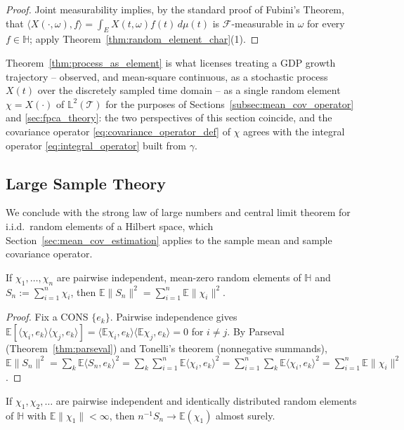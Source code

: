 \begin{proof}
Joint measurability implies, by the standard proof of Fubini's Theorem,
that $\langle X(\cdot,\omega),f\rangle=\int_EX(t,\omega)f(t)\,d\mu(t)$ is
$\mathcal{F}$-measurable in $\omega$ for every $f\in\mathbb{H}$; apply
Theorem~\ref{thm:random_element_char}(1).
\end{proof}

Theorem~\ref{thm:process_as_element} is what licenses treating a GDP
growth trajectory -- observed, and mean-square continuous, as a
stochastic process $X(t)$ over the discretely sampled time domain -- as a
single random element $\chi=X(\cdot)$ of $\mathbb{L}^2(\mathcal{T})$ for
the purposes of Sections~\ref{subsec:mean_cov_operator} and
\ref{sec:fpca_theory}: the two perspectives of this section coincide, and
the covariance operator \eqref{eq:covariance_operator_def} of $\chi$
agrees with the integral operator \eqref{eq:integral_operator} built from
$\gamma$.

\subsection{Large Sample Theory}
\label{subsec:large_sample}

We conclude with the strong law of large numbers and central limit
theorem for i.i.d.\ random elements of a Hilbert space, which
Section~\ref{sec:mean_cov_estimation} applies to the sample mean and
sample covariance operator.

\begin{theorem}
\label{thm:pairwise_variance}
If $\chi_1,\dots,\chi_n$ are pairwise independent, mean-zero random
elements of $\mathbb{H}$ and $S_n:=\sum_{i=1}^n\chi_i$, then $\mathbb{E}
\|S_n\|^2 = \sum_{i=1}^n\mathbb{E}\|\chi_i\|^2$.
\end{theorem}

\begin{proof}
Fix a CONS $\{e_k\}$. Pairwise independence gives $\mathbb{E}[\langle
\chi_i,e_k\rangle\langle\chi_j,e_k\rangle] = \langle\mathbb{E}\chi_i,e_k
\rangle\langle\mathbb{E}\chi_j,e_k\rangle=0$ for $i\neq j$. By Parseval
(Theorem~\ref{thm:parseval}) and Tonelli's theorem (nonnegative summands),
$\mathbb{E}\|S_n\|^2 = \sum_k\mathbb{E}\langle S_n,e_k\rangle^2 = \sum_k
\sum_{i=1}^n\mathbb{E}\langle\chi_i,e_k\rangle^2 = \sum_{i=1}^n\sum_k
\mathbb{E}\langle\chi_i,e_k\rangle^2 = \sum_{i=1}^n\mathbb{E}\|\chi_i\|^2$.
\end{proof}

\begin{theorem}
\label{thm:slln}
If $\chi_1,\chi_2,\dots$ are pairwise independent and identically
distributed random elements of $\mathbb{H}$ with $\mathbb{E}\|\chi_1\|<
\infty$, then $n^{-1}S_n\to\mathbb{E}(\chi_1)$ almost surely.
\end{theorem}

